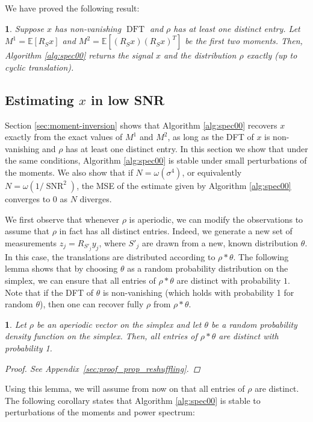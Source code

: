 \documentclass{IEEEtran}
\numberwithin{equation}{section}
\numberwithin{figure}{section}
\theoremstyle{plain}
\theoremstyle{definition}
\theoremstyle{remark}
\theoremstyle{plain}
\newtheorem{lem}[thm]{\protect\lemmaname}
\theoremstyle{remark}
\theoremstyle{plain}
\theoremstyle{plain}
\newtheorem{proposition}[thm]{\protect\propositionname}
\theoremstyle{remark}
\providecommand{\lemmaname}{Lemma}
\providecommand{\propositionname}{Proposition}
\newcommand{\E}{\mathbb{E}}
\newcommand{\DFT}{\operatorname{DFT}}
\newcommand{\SNR}{\operatorname{SNR}}
\begin{document}
We have proved the following result:
\begin{proposition}
Suppose $x$ has non-vanishing $\DFT$ and $\rho$ has at least one distinct entry. Let $M^1 = \E[R_S x]$ and $M^2 = \E[(R_S x)(R_S x)^T]$ be the first two moments. Then, Algorithm \ref{alg:spec00} returns the signal $x$ and the distribution $\rho$ exactly (up to cyclic translation).
\end{proposition}

\subsection{Estimating $x$ in low SNR}
\label{sec:spectral_method}

Section \ref{sec:moment-inversion} shows that Algorithm \ref{alg:spec00} recovers $x$ exactly from the exact values of $M^1$ and $M^2$, as long as the DFT of $x$ is non-vanishing and $\rho$ has at least one distinct entry. In this section we show that under the same conditions, Algorithm \ref{alg:spec00} is stable under small perturbations of the moments. We also show that if $N=\omega(\sigma^4)$, or equivalently $N=\omega(1/\SNR^2)$, the MSE of the estimate given by Algorithm \ref{alg:spec00} converges to $0$ as $N$ diverges.

We first observe that whenever $\rho$ is aperiodic, we can modify the observations to assume that $\rho$ in fact has all distinct entries. Indeed, we generate a new set of measurements $z_j = R_{S'_j}y_j$, where $S'_j$ are drawn from a new, known distribution $\theta$. In this case, the translations are distributed according to $\rho \ast \theta$. The following lemma shows that by choosing $\theta$ as a random probability distribution on the simplex, we can ensure that all entries of $\rho \ast \theta$ are distinct with probability $1$. Note that if the DFT of $\theta$ is non-vanishing (which holds with probability 1 for random $\theta$), then one can recover fully $\rho$ from $\rho \ast \theta$.

\begin{lem} \label{prop:reshuffling}
%
Let $\rho$ be an aperiodic vector on the simplex and let $\theta$ be a random probability density function on the simplex. Then, all entries of $\rho\ast\theta$ are distinct with probability 1.
\begin{proof}
%
See Appendix~\ref{sec:proof_prop_reshuffling}.
\end{proof}
\end{lem}
%
Using this lemma, we will assume from now on that all entries of $\rho$ are distinct. The following corollary states that Algorithm \ref{alg:spec00} is stable to perturbations of the moments and power spectrum:
\end{document}
